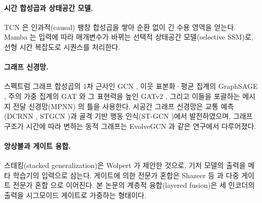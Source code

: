 \paragraph{시간 합성곱과 상태공간 모델.} TCN \cite{bai2018empirical}은 인과적(causal) 팽창 합성곱을 쌓아 순환 없이 긴 수용 영역을 얻는다. Mamba \cite{gu2023mamba}는 입력에 따라 매개변수가 바뀌는 선택적 상태공간 모델(selective SSM)로, 선형 시간 복잡도로 시퀀스를 처리한다.

\paragraph{그래프 신경망.} 스펙트럼 그래프 합성곱의 1차 근사인 GCN \cite{kipf2017semi}, 이웃 표본화·평균 집계의 GraphSAGE \cite{hamilton2017inductive}, 주의 가중 집계의 GAT \cite{velickovic2018graph}와 그 표현력을 높인 GATv2 \cite{brody2022how}, 그리고 이들을 포괄하는 메시지 전달 신경망(MPNN) \cite{gilmer2017neural}의 틀을 사용한다. 시공간 그래프 신경망은 교통 예측(DCRNN \cite{li2018diffusion}, STGCN \cite{yu2018spatio})과 골격 기반 행동 인식(ST-GCN \cite{yan2018spatial})에서 발전하였으며, 그래프 구조가 시간에 따라 변하는 동적 그래프는 EvolveGCN \cite{pareja2020evolvegcn}과 같은 연구에서 다루어졌다.

\paragraph{앙상블과 게이트 융합.} 스태킹(stacked generalization)은 Wolpert \cite{wolpert1992stacked}가 제안한 것으로, 기저 모델의 출력을 메타 학습기의 입력으로 삼는다. 게이트에 의한 전문가 혼합은 Shazeer 등 \cite{shazeer2017outrageously}과 다중 게이트 전문가 혼합 \cite{ma2018modeling}으로 이어진다. 본 논문의 계층적 융합(layered fusion)은 세 인코더의 출력을 시그모이드 게이트로 가중하는 형태이다.
